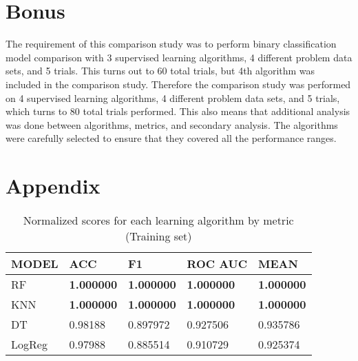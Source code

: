 \documentclass[twoside,11pt]{article}
\begin{document}
\section{Bonus}

The requirement of this comparison study was to perform binary classification 
model comparison with 3 supervised learning algorithms, 4 different 
problem data sets, and 5 trials. This turns out to 60 total trials, but 4th 
algorithm was included in the comparison study. Therefore the comparison 
study was performed on 4 supervised learning algorithms, 4 different 
problem data sets, and 5 trials, which turns to 80 total trials performed.
This also means that additional analysis was done between algorithms, 
metrics, and secondary analysis. The algorithms were carefully selected to 
ensure that they covered all the performance ranges.




\appendix
\section*{Appendix}

    \begin{table}[H]
    \centering
    \caption{\label{tab:Table 4.} Normalized scores for each learning algorithm by metric (Training set)}
    \begin{tabular}{|l|lll|l|}
    \hline
    \textbf{MODEL} & \textbf{ACC}      & \textbf{F1}       & \textbf{ROC AUC}  & \textbf{MEAN}     \\ \hline
    RF             & \textbf{1.000000} & \textbf{1.000000} & \textbf{1.000000} & \textbf{1.000000} \\
    KNN            & \textbf{1.000000} & \textbf{1.000000} & \textbf{1.000000} & \textbf{1.000000} \\
    DT             & 0.98188           & 0.897972          & 0.927506          & 0.935786          \\
    LogReg         & 0.97988           & 0.885514          & 0.910729          & 0.925374          \\ \hline
    \end{tabular}
    \end{table}
    
\end{document}
